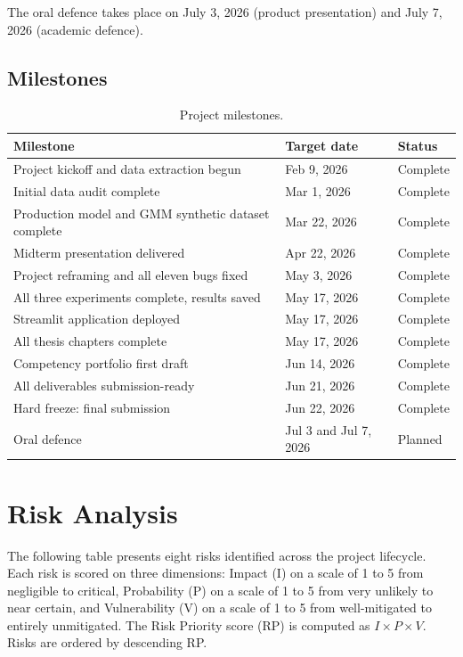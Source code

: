 \documentclass[11pt,a4paper]{article}
\begin{document}
The oral defence takes place on July 3, 2026 (product presentation) and July 7, 2026 (academic defence).

\subsection{Milestones}

\begin{table}[H]
  \centering
  \caption{Project milestones.}
  \label{tab:milestones}
  \begin{tabular}{p{8cm} p{3.5cm} p{2cm}}
    \toprule
    \textbf{Milestone} & \textbf{Target date} & \textbf{Status} \\
    \midrule
    Project kickoff and data extraction begun & Feb 9, 2026 & Complete \\
    Initial data audit complete & Mar 1, 2026 & Complete \\
    Production model and GMM synthetic dataset complete & Mar 22, 2026 & Complete \\
    Midterm presentation delivered & Apr 22, 2026 & Complete \\
    Project reframing and all eleven bugs fixed & May 3, 2026 & Complete \\
    All three experiments complete, results saved & May 17, 2026 & Complete \\
    Streamlit application deployed & May 17, 2026 & Complete \\
    All thesis chapters complete & May 17, 2026 & Complete \\
    Competency portfolio first draft & Jun 14, 2026 & Complete \\
    All deliverables submission-ready & Jun 21, 2026 & Complete \\
    Hard freeze: final submission & Jun 22, 2026 & Complete \\
    Oral defence & Jul 3 and Jul 7, 2026 & Planned \\
    \bottomrule
  \end{tabular}
\end{table}

\section{Risk Analysis}

The following table presents eight risks identified across the project lifecycle. Each risk is scored on three dimensions: Impact (I) on a scale of 1 to 5 from negligible to critical, Probability (P) on a scale of 1 to 5 from very unlikely to near certain, and Vulnerability (V) on a scale of 1 to 5 from well-mitigated to entirely unmitigated. The Risk Priority score (RP) is computed as $I \times P \times V$. Risks are ordered by descending RP.
\end{document}
